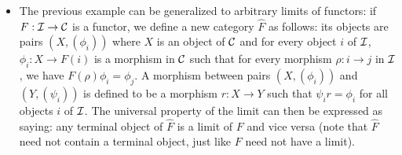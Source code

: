 \documentclass[12pt]{article}
\begin{document}
\begin {itemize}
\item The previous example can be generalized to arbitrary limits of functors: if $F:\cal{I}\rightarrow\cal{C}$ is a functor, we define a new category $\hat{F}$ as follows: its objects are pairs $(X,(\phi_i))$ where $X$ is an object of $\cal{C}$ and for every object $i$ of $\cal{I}$, $\phi_i:X\rightarrow F(i)$ is a morphism in $\cal{C}$ such that for every morphism $\rho:i\rightarrow j$ in $\cal{I}$, we have $F(\rho)\phi_i=\phi_j$. A morphism between pairs $(X,(\phi_i))$ and $(Y,(\psi_i))$ is defined to be a morphism $r:X\rightarrow Y$ such that $\psi_i r=\phi_i$ for all objects $i$ of $\cal{I}$. The universal property of the limit can then be expressed as saying: any terminal object of $\hat{F}$ is a limit of $F$ and vice versa (note that $\hat{F}$ need not contain a terminal object, just like $F$ need not have a limit).

\end {itemize}
\end{document}

